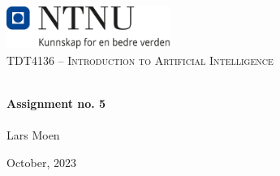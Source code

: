 \begin{titlepage}
\vbox{ }
\vbox{ }
\begin{center}
\includegraphics[width=0.40\textwidth]{Images/NTNU_logo.png}\\[1cm]
\textsc{\Large TDT4136 – Introduction to Artificial Intelligence}\\[0.5cm]
\vbox{ }

\HRule \\[0.4cm]
{ \huge \bfseries Assignment no. 5}\\[0.4cm]
\HRule \\[1.5cm]

\large
Lars Moen
\vfill

{\large October, 2023}
\end{center}
\end{titlepage}